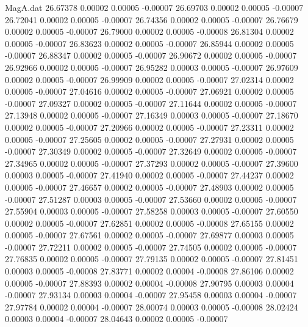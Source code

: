\begin{filecontents}{MagA.dat}
  26.67378    0.00002    0.00005   -0.00007
  26.69703    0.00002    0.00005   -0.00007
  26.72041    0.00002    0.00005   -0.00007
  26.74356    0.00002    0.00005   -0.00007
  26.76679    0.00002    0.00005   -0.00007
  26.79000    0.00002    0.00005   -0.00008
  26.81304    0.00002    0.00005   -0.00007
  26.83623    0.00002    0.00005   -0.00007
  26.85944    0.00002    0.00005   -0.00007
  26.88347    0.00002    0.00005   -0.00007
  26.90672    0.00002    0.00005   -0.00007
  26.92966    0.00002    0.00005   -0.00007
  26.95282    0.00003    0.00005   -0.00007
  26.97609    0.00002    0.00005   -0.00007
  26.99909    0.00002    0.00005   -0.00007
  27.02314    0.00002    0.00005   -0.00007
  27.04616    0.00002    0.00005   -0.00007
  27.06921    0.00002    0.00005   -0.00007
  27.09327    0.00002    0.00005   -0.00007
  27.11644    0.00002    0.00005   -0.00007
  27.13948    0.00002    0.00005   -0.00007
  27.16349    0.00003    0.00005   -0.00007
  27.18670    0.00002    0.00005   -0.00007
  27.20966    0.00002    0.00005   -0.00007
  27.23311    0.00002    0.00005   -0.00007
  27.25605    0.00002    0.00005   -0.00007
  27.27931    0.00002    0.00005   -0.00007
  27.30349    0.00002    0.00005   -0.00007
  27.32649    0.00002    0.00005   -0.00007
  27.34965    0.00002    0.00005   -0.00007
  27.37293    0.00002    0.00005   -0.00007
  27.39600    0.00003    0.00005   -0.00007
  27.41940    0.00002    0.00005   -0.00007
  27.44237    0.00002    0.00005   -0.00007
  27.46657    0.00002    0.00005   -0.00007
  27.48903    0.00002    0.00005   -0.00007
  27.51287    0.00003    0.00005   -0.00007
  27.53660    0.00002    0.00005   -0.00007
  27.55904    0.00003    0.00005   -0.00007
  27.58258    0.00003    0.00005   -0.00007
  27.60550    0.00002    0.00005   -0.00007
  27.62851    0.00002    0.00005   -0.00008
  27.65155    0.00002    0.00005   -0.00007
  27.67561    0.00002    0.00005   -0.00007
  27.69877    0.00003    0.00005   -0.00007
  27.72211    0.00002    0.00005   -0.00007
  27.74505    0.00002    0.00005   -0.00007
  27.76835    0.00002    0.00005   -0.00007
  27.79135    0.00002    0.00005   -0.00007
  27.81451    0.00003    0.00005   -0.00008
  27.83771    0.00002    0.00004   -0.00008
  27.86106    0.00002    0.00005   -0.00007
  27.88393    0.00002    0.00004   -0.00008
  27.90795    0.00003    0.00004   -0.00007
  27.93134    0.00003    0.00004   -0.00007
  27.95458    0.00003    0.00004   -0.00007
  27.97784    0.00002    0.00004   -0.00007
  28.00074    0.00003    0.00005   -0.00008
  28.02424    0.00003    0.00004   -0.00007
  28.04643    0.00002    0.00005   -0.00007

\end{filecontents}
